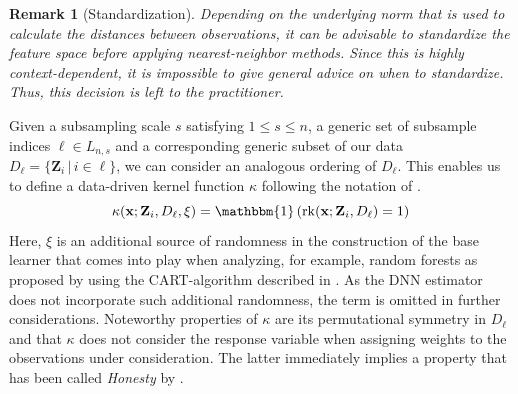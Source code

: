 \documentclass[letterpaper,10pt]{article}
\numberwithin{equation}{section}
\numberwithin{thm}{section}
\newtheorem{rmk}{Remark}
\newcommand{\1}{\mathbb{1}}
\begin{document}
\vspace{0.5cm}
\begin{rmk}[Standardization]
	Depending on the underlying norm that is used to calculate the distances between observations, it can be advisable to standardize the feature space before applying nearest-neighbor methods.
	Since this is highly context-dependent, it is impossible to give general advice on when to standardize.
	Thus, this decision is left to the practitioner.
\end{rmk}
Given a subsampling scale $s$ satisfying $1 \leq s \leq n$, a generic set of subsample indices $\ell \in L_{n,s}$ and a corresponding generic subset of our data $D_{\ell} = \{\mathbf{Z}_i \, | \, i \in \ell\}$, we can consider an analogous ordering of $D_{\ell}$.
This enables us to define a data-driven kernel function $\kappa$ following the notation of \citet{ritzwoller_uniform_2024}.
\begin{equation}
	\kappa(\mathbf{x}; \mathbf{Z}_i, D_{\ell}, \xi)
	= \mathbbm{1}\left(\operatorname{rk}(\mathbf{x}; \mathbf{Z}_i, D_{\ell}) = 1\right)
\end{equation}
Here, $\xi$ is an additional source of randomness in the construction of the base learner that comes into play when analyzing, for example, random forests as proposed by \citet{breiman_random_2001} using the CART-algorithm described in \citet{breiman_classification_2017}.
As the DNN estimator does not incorporate such additional randomness, the term is omitted in further considerations.
Noteworthy properties of $\kappa$ are its permutational symmetry in $D_{\ell}$ and that $\kappa$ does not consider the response variable when assigning weights to the observations under consideration.
The latter immediately implies a property that has been called \textit{Honesty} by \citet{wager_estimation_2018}.
\end{document}
